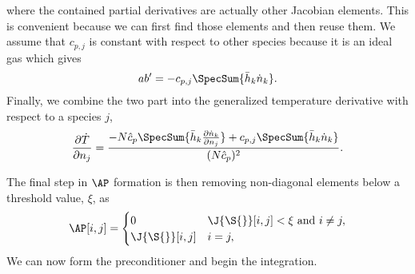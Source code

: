 where the contained partial derivatives are actually other Jacobian elements.
This is convenient because we can first find those elements and then reuse them.
We assume that $c_{p,j}$ is constant with respect to other species because it is an ideal gas which gives
\begin{equation}
    a b^\prime = -c_{p,j}\SpecSum{\bar{h}_k \dot{n}_k}.
\end{equation}
Finally, we combine the two part into the generalized temperature derivative with respect to a species $j$,
\begin{equation}
    \label{eq:temp-species}
    \frac{\partial \dot{T}}{\partial n_j} = \frac{-N\hat{c}_p\SpecSum{\bar{h}_k \frac{\partial \dot{n}_k}{\partial n_j}} + c_{p,j}\SpecSum{\bar{h}_k \dot{n}_k}}{(N\hat{c}_p)^2}.
\end{equation}

The final step in $\AP$ formation is then removing non-diagonal elements below a threshold value, $\xi$, as
\begin{equation}
    \AP[i,j] =
    \begin{cases}
        0 & \J{\S{}}[i,j] < \xi \text{ and } i \neq j, \\
        \J{\S{}}[i,j] & i = j,
    \end{cases}
\end{equation}
We can now form the preconditioner and begin the integration.

